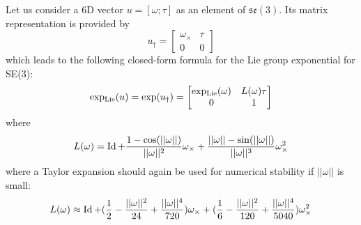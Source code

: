Let us consider a 6D vector $u=[\omega;\tau]$ as an element of $\mathfrak{se}(3)$. Its matrix representation is provided by
\begin{equation}
u_\dagger =
\begin{bmatrix}
\omega_\times & \tau \\
0  & 0
\end{bmatrix}
\end{equation}
which leads to the following closed-form formula for the Lie group exponential for SE(3):
\begin{equation}
\operatorname{exp_{Lie}}(u) = \exp(u_\dagger) =
\begin{bmatrix}
\operatorname{exp_{Lie}}(\omega) & L(\omega)\tau \\
0  & 1
\end{bmatrix}
\end{equation}
where
\begin{equation}
L(\omega) = \operatorname{Id}
+ \frac{1-\cos(||\omega||)}{||\omega||^2}\omega_\times
+ \frac{||\omega||-\sin(||\omega||)}{||\omega||^3}\omega_\times^2
\end{equation}
where a Taylor expansion should again be used for numerical stability if $||\omega||$ is small:
\begin{equation}
L(\omega) \approx \operatorname{Id}
+ (\frac{1}{2}-\frac{||\omega||^2}{24}+\frac{||\omega||^4}{720})\omega_\times
+ (\frac{1}{6}-\frac{||\omega||^2}{120}+\frac{||\omega||^4}{5040})\omega_\times^2
\end{equation}

